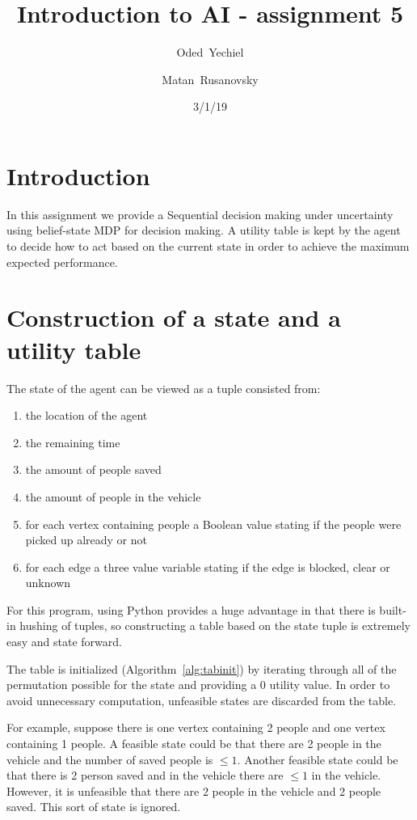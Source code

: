 \documentclass{article}                     %
\begin{document}
	
\title{Introduction to AI - assignment 5}


\author{Oded~Yechiel         \and
	Matan~Rusanovsky
}

\date{3/1/19}

\maketitle

\section{Introduction}
	In this assignment we provide a Sequential decision making under uncertainty using belief-state MDP for decision making.
	A utility table is kept by the agent to decide how to act based on the current state in order to achieve the maximum expected performance.
	

\section{Construction of a state and a utility table}
The state of the agent can be viewed as a tuple consisted from:
\begin{enumerate}
	\item the location of the agent
	\item the remaining time
	\item the amount of people saved
	\item the amount of people in the vehicle
	\item for each vertex containing people a Boolean value stating if the people were picked up already or not
	\item for each edge a three value variable stating if the edge is blocked, clear or unknown
\end{enumerate}

For this program, using Python provides a huge advantage in that there is built-in hushing of tuples, so constructing a table based on the state tuple is extremely easy and state forward.

The table is initialized (Algorithm~\ref{alg:tabinit}) by iterating through all of the permutation possible for the state and providing a 0 utility value. In order to avoid unnecessary computation, unfeasible states are discarded from the table. 

For example, suppose there is one vertex containing 2 people and one vertex containing 1 people. A feasible state could be that there are 2 people in the vehicle and the number of saved people is $ \leq 1 $. Another feasible state could be that there is 2 person saved and in the vehicle there are $ \leq 1 $ in the vehicle. However, it is unfeasible that there are 2 people in the vehicle and 2 people saved. This sort of state is ignored. 
\end{document}

